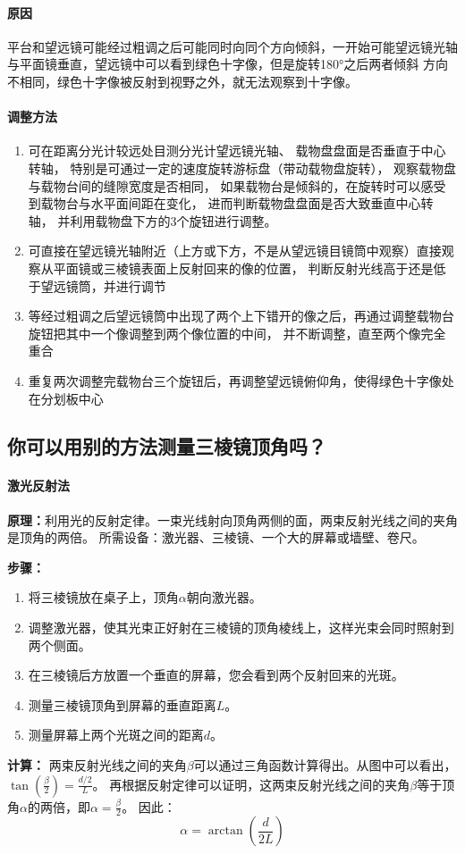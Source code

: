 \documentclass{../../templates/Report}%
\begin{document}
\paragraph{原因} 平台和望远镜可能经过粗调之后可能同时向同个方向倾斜，一开始可能望远镜光轴与平面镜垂直，望远镜中可以看到绿色十字像，但是旋转\ang{180}之后两者倾斜
方向不相同，绿色十字像被反射到视野之外，就无法观察到十字像。
\paragraph{调整方法}
\begin{enumerate}
  \item 可在距离分光计较远处目测分光计望远镜光轴、
  载物盘盘面是否垂直于中心转轴，
  特别是可通过一定的速度旋转游标盘（带动载物盘旋转），
  观察载物盘与载物台间的缝隙宽度是否相同，
  如果载物台是倾斜的，在旋转时可以感受到载物台与水平面间距在变化，
  进而判断载物盘盘面是否大致垂直中心转轴，
  并利用载物盘下方的3个旋钮进行调整。
  \item 可直接在望远镜光轴附近（上方或下方，不是从望远镜目镜筒中观察）直接观察从平面镜或三棱镜表面上反射回来的像的位置，
  判断反射光线高于还是低于望远镜筒，并进行调节
  \item 等经过粗调之后望远镜筒中出现了两个上下错开的像之后，再通过调整载物台旋钮把其中一个像调整到两个像位置的中间，
  并不断调整，直至两个像完全重合
  \item 重复两次调整完载物台三个旋钮后，再调整望远镜俯仰角，使得绿色十字像处在分划板中心
\end{enumerate}
\subsection{你可以用别的方法测量三棱镜顶角吗？}
\paragraph{激光反射法}
\textbf{原理：}利用光的反射定律。一束光线射向顶角两侧的面，两束反射光线之间的夹角是顶角的两倍。
所需设备：激光器、三棱镜、一个大的屏幕或墙壁、卷尺。

\textbf{步骤：}

\begin{enumerate}[label=\textbf{Step }\arabic{*}.]
  \item 将三棱镜放在桌子上，顶角$\alpha$朝向激光器。
  \item 调整激光器，使其光束正好射在三棱镜的顶角棱线上，这样光束会同时照射到两个侧面。
  \item 在三棱镜后方放置一个垂直的屏幕，您会看到两个反射回来的光斑。
  \item 测量三棱镜顶角到屏幕的垂直距离$L$。
  \item 测量屏幕上两个光斑之间的距离$d$。
\end{enumerate}

\textbf{计算：}
两束反射光线之间的夹角$\beta$可以通过三角函数计算得出。从图中可以看出，$ \tan(\frac{\beta}{2}) = \frac{d/2}{L} $。
再根据反射定律可以证明，这两束反射光线之间的夹角$\beta$等于顶角$\alpha$的两倍，即$\alpha = \frac{\beta}{2}$。
因此：
\[
\alpha = \arctan(\frac{d}{2L})
\]
\insertnotes
\end{document}
